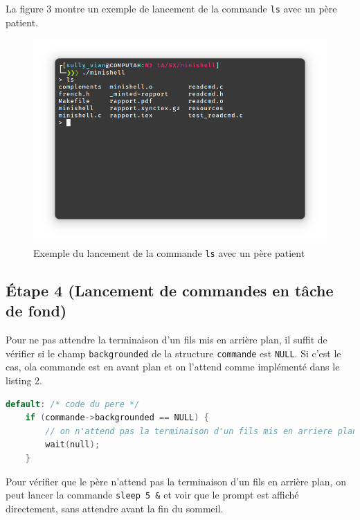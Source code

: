 \documentclass{article}
\begin{document}
La figure 3 montre un exemple de lancement de la commande \texttt{ls} avec un père patient.

\begin{figure}[H]
    \centering
    \includegraphics[width=1\textwidth]{./resources/E3.png}
    \caption{Exemple du lancement de la commande \texttt{ls} avec un père patient}
\end{figure}

\subsection*{Étape 4 (Lancement de commandes en tâche de fond)}

Pour ne pas attendre la terminaison d'un fils mis en arrière plan, il suffit de vérifier si le champ \texttt{backgrounded} de la structure \texttt{commande} est \texttt{NULL}. Si c'est le cas, ola commande est en avant plan et on l'attend comme implémenté dans le listing 2.

\begin{lstlisting}[language=C, caption=Ajout pour la question 4]
default: /* code du pere */
    if (commande->backgrounded == NULL) {
        // on n'attend pas la terminaison d'un fils mis en arriere plan
        wait(null);
    }
\end{lstlisting}

Pour vérifier que le père n'attend pas la terminaison d'un fils en arrière plan, on peut lancer la commande \texttt{sleep 5 \&} et voir que le prompt est affiché directement, sans attendre avant la fin du sommeil.
\end{document}

